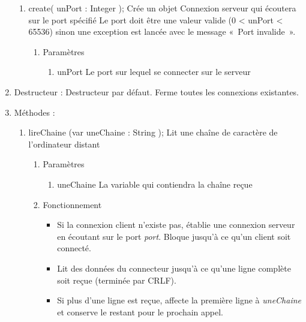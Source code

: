 \documentclass[12pt,pdftex,oneside]{uqam_these}
\begin{document}
\begin{enumerate}
\begin{enumerate}
  \item create( unPort : Integer );
        Crée un objet Connexion serveur qui écoutera sur le port spécifié
        Le port doit être une valeur valide (0 < unPort < 65536) sinon une
        exception est lancée avec le message «~Port invalide~».
        \begin{enumerate}
        \item Paramètres
          \begin{enumerate}
          \item unPort
                Le port sur lequel se connecter sur le serveur
          \end{enumerate}
        \end{enumerate}
  \end{enumerate}

\item Destructeur : 
Destructeur par défaut. Ferme toutes les connexions existantes.

\item Méthodes : 

  \begin{enumerate}
  \item lireChaine (var uneChaine : String );
        Lit une chaîne de caractère de l'ordinateur distant
        \begin{enumerate}
        \item Paramètres
          \begin{enumerate}
          \item uneChaine
                La variable qui contiendra la chaîne reçue
          \end{enumerate}
        \item Fonctionnement
          \begin{itemize}
          \item Si la connexion client n'existe pas, établie une connexion
          serveur en écoutant sur le port \emph{port}. Bloque jusqu'à
          ce qu'un client soit connecté.

          \item Lit des données du connecteur jusqu'à ce qu'une ligne
            complète soit reçue (terminée par CRLF).

          \item Si plus d'une ligne est reçue, affecte la
            première ligne à \emph{uneChaine} et conserve le restant pour le prochain appel.
          \end{itemize}


\end{enumerate}
\end{enumerate}
\end{enumerate}
\end{document}
